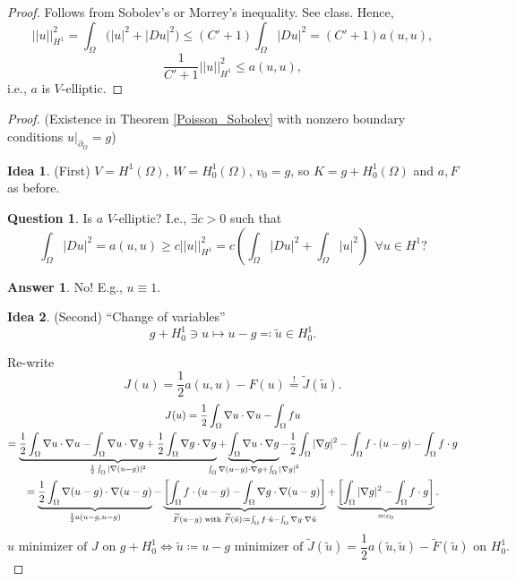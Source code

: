 \documentclass[12pt]{article}
\theoremstyle{definition}
\newtheorem*{idea}{Idea}
\newtheorem*{question}{Question}
\newtheorem*{answer}{Answer}
\begin{document}
\begin{proof}
Follows from Sobolev's or Morrey's inequality. See class. Hence,
\[||u||_{H^1}^2=\int_\Omega\big(|u|^2+|Du|^2\big)\leq(C'+1)\int_\Omega|Du|^2=(C'+1)a(u,u),\]
\[\frac1{C'+1}||u||_{H^1}^2\leq a(u,u),\]
i.e., $a$ is $V$-elliptic.
\end{proof}

\begin{proof}
(Existence in Theorem \ref{Poisson_Sobolev} with nonzero boundary conditions $u|_{\partial_\Omega}=g$)

\begin{idea}
(First) $V=H^1(\Omega)$, $W=H_0^1(\Omega)$, $v_0=g$, so $K=g+H_0^1(\Omega)$ and $a,F$ as before.
\end{idea}

\begin{question}
Is $a$ $V$-elliptic? I.e., $\exists c>0$ such that
\[\int_\Omega|Du|^2=a(u,u)\geq c||u||_{H^1}^2=c\left(\int_\Omega|Du|^2+\int_\Omega|u|^2\right)\ \ \forall u\in H^1\text{?}\]
\end{question}

\begin{answer}
No! E.g., $u\equiv1$.
\end{answer}

\begin{idea}
(Second) ``Change of variables''
\[g+H_0^1\ni u\longmapsto u-g\eqqcolon\tilde u\in H_0^1.\]
\end{idea}

Re-write
\[J(u)=\frac12a(u,u)-F(u)\overset!=\widetilde J(\tilde u).\]
\begin{multline*}
J(u)=\frac12\int_\Omega\nabla u\cdot\nabla u-\int_\Omega fu\\
=\underbrace{\frac12\int_\Omega\nabla u\cdot\nabla u-\int_\Omega\nabla u\cdot\nabla g+\frac12\int_\Omega\nabla g\cdot\nabla g}_{\frac12\int_\Omega|\nabla(u-g)|^2}+\underbrace{\int_\Omega\nabla u\cdot\nabla g}_{\mathclap{\int_\Omega\nabla(u-g)\cdot\nabla g+\int_\Omega|\nabla g|^2}}-\frac12\int_\Omega|\nabla g|^2-\int_\Omega f\cdot(u-g)-\int_\Omega f\cdot g\\
=\underbrace{\frac12\int_\Omega\nabla(u-g)\cdot\nabla(u-g)}_{\frac12a(u-g,u-g)}-\underbrace{\left[\int_\Omega f\cdot(u-g)-\int_\Omega\nabla g\cdot\nabla(u-g)\right]}_{\widetilde F(u-g)\text{ with }\widetilde F(\tilde u)\coloneqq\int_\Omega f\cdot\tilde u-\int_\Omega\nabla g\cdot\nabla\tilde u}+\underbrace{\left[\int_\Omega|\nabla g|^2-\int_\Omega f\cdot g\right]}_{\eqqcolon c_0}.
\end{multline*}
\[u\text{ minimizer of }J\text{ on }g+H_0^1\Longleftrightarrow\tilde u\coloneqq u-g\text{ minimizer of }\widetilde J(\tilde u)=\frac12a(\tilde u,\tilde u)-\widetilde F(\tilde u)\text{ on }H_0^1.\]


\end{proof}
\end{document}
